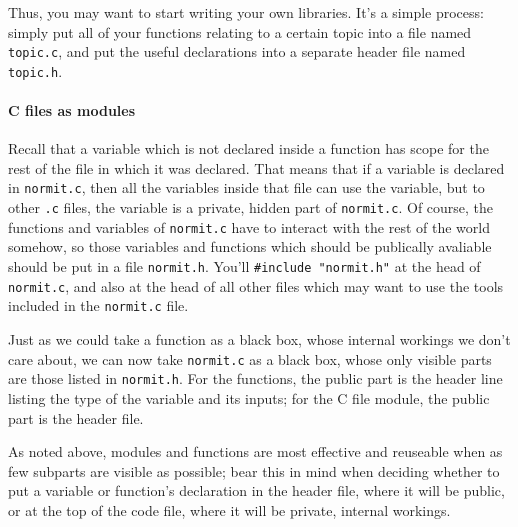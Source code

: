 \documentclass[12pt]{article}
\begin{document}
Thus, you may want to start writing your own libraries. It's a simple
process: simply put all of your functions relating to a certain topic
into a file named {\tt topic.c}, and put the useful declarations into a separate header file named {\tt
topic.h}. 


\paragraph{C files as modules}
Recall that a variable which is not declared inside a function has scope for the rest of the file in
which it was declared. That means that if a variable is declared in {\tt normit.c}, then all the variables
inside that file can use the variable, but to other {\tt .c} files, the variable is
a private, hidden part of {\tt normit.c}. Of course, the functions and variables of {\tt normit.c} have
to interact with the rest of the world somehow, so those variables and functions which should be
publically avaliable should be put in a file {\tt normit.h}. You'll {\tt \#include "normit.h"} at the head
of {\tt normit.c}, and also at the head of all other files which may want to use the tools included in
the {\tt normit.c} file.

Just as we could take a function as a black box, whose internal workings
we don't care about, we can now take {\tt normit.c} as a black box,
whose only visible parts are those listed in {\tt normit.h}. For the functions, the public part is the
header line listing the type of the variable and its inputs; for the C file module, the public part is
the header file. 

As noted above, modules and functions are most effective and  reuseable when as few
subparts are visible as possible; bear this in mind when deciding whether to put a variable or
function's declaration in the header file, where it will be public, or at the top of the code file,
where it will be private, internal workings.
\end{document}
